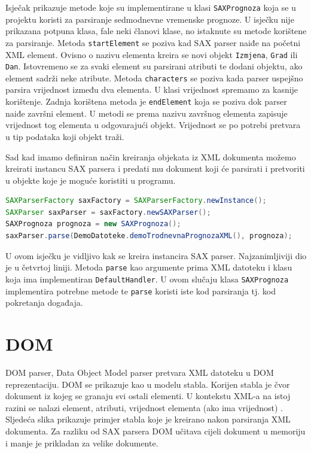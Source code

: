 \documentclass[]{foi}
\begin{document}
Isječak prikazuje metode koje su implementirane u klasi \texttt{SAXPrognoza} koja se u
projektu koristi za parsiranje sedmodnevne vremenske prognoze. U isječku nije prikazana
potpuna klasa, fale neki članovi klase, no istaknute su metode korištene za parsiranje.
Metoda \texttt{startElement} se poziva kad SAX parser naiđe na početni XML element. Ovisno
o nazivu elementa kreira se novi objekt \texttt{Izmjena}, \texttt{Grad} ili \texttt{Dan}. Istovremeno se za svaki
element su parsirani atributi te dodani objektu, ako element sadrži neke atribute. Metoda
\texttt{characters} se poziva kada parser uspejšno parsira vrijednost između dva elementa.
U klasi vrijednost spremamo za kasnije korištenje. Zadnja korištena metoda je \texttt{endElement}
koja se poziva dok parser naiđe završni element. U metodi se prema nazivu završnog elementa
zapisuje vrijednost tog elementa u odgovarajući objekt. Vrijednost se po potrebi pretvara
u tip podataka koji objekt traži.

Sad kad imamo definiran način kreiranja objekata iz XML dokumenta možemo kreirati instancu
SAX parsera i predati mu dokument koji će parsirati i pretvoriti u objekte koje je moguće
koristiti u programu.

\begin{lstlisting}[language=java, caption={Kreiranje instance SAX parsera i parsiranje XML datoteke}]
SAXParserFactory saxFactory = SAXParserFactory.newInstance();
SAXParser saxParser = saxFactory.newSAXParser();
SAXPrognoza prognoza = new SAXPrognoza();
saxParser.parse(DemoDatoteke.demoTrodnevnaPrognozaXML(), prognoza);
\end{lstlisting}

U ovom isječku je vidljivo kak se kreira instancira SAX parser. Najzanimljiviji dio
je u četvrtoj liniji. Metoda \texttt{parse} kao argumente prima XML datoteku i klasu
koja ima implementiran \texttt{DefaultHandler}. U ovom slučaju klasa \texttt{SAXPrognoza}
implementira potrebne metode te \texttt{parse} koristi iste kod parsiranja tj. kod
pokretanja događaja.

\section{DOM}
DOM parser, Data Object Model parser pretvara XML datoteku u DOM reprezentaciju.
DOM se prikazuje kao u modelu stabla. Korijen stabla je čvor dokument iz kojeg se
granaju svi ostali elementi. U kontekstu XML-a na istoj razini se nalazi element,
atributi, vrijednost elementa (ako ima vrijednost) \cite{java_and_xml}. Sljedeća slika prikazuje primjer
stabla koje je kreirano nakon parsiranja XML dokumenta. Za razliku od SAX parsera
DOM učitava cijeli dokument u memoriju i manje je prikladan za velike dokumente.
\end{document}
